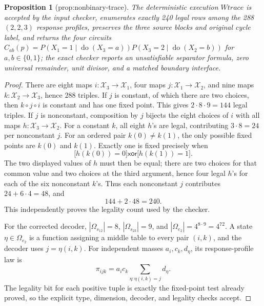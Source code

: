 \documentclass{article}
\newtheorem{proposition}{Proposition}
\begin{document}
\begin{proposition}[prop:nonbinary-trace]\label{prop:nonbinary-trace}
The deterministic execution \(Wtrace\) is accepted by the input checker, enumerates exactly 240 legal rows among the 288 \((2,2,3)\) response profiles, preserves the three source blocks and original cycle label, and returns the four circuits \(C_{ab}(p)=P(X_1=1\mid\operatorname{do}(X_3=a))P(X_3=2\mid\operatorname{do}(X_2=b))\) for \(a,b\in\{0,1\}\); the exact checker reports an unsatisfiable separator formula, zero universal remainder, unit divisor, and a matched boundary interface.
\end{proposition}
\begin{proof}
There are eight maps \(i:\mathcal X_3\to\mathcal X_1\), four maps \(j:\mathcal X_1\to\mathcal X_2\), and nine maps \(k:\mathcal X_2\to\mathcal X_3\), hence \(288\) triples.  If \(j\) is constant, of which there are two choices, then \(k\circ j\circ i\) is constant and has one fixed point.  This gives \(2\cdot8\cdot9=144\) legal triples.  If \(j\) is nonconstant, composition by \(j\) bijects the eight choices of \(i\) with all maps \(h:\mathcal X_3\to\mathcal X_2\).  For a constant \(k\), all eight \(h\)'s are legal, contributing \(3\cdot8=24\) per nonconstant \(j\).  For an ordered pair \(k(0)\ne k(1)\), the only possible fixed points are \(k(0)\) and \(k(1)\).  Exactly one is fixed precisely when
\[
 \bigl[h(k(0))=0\bigr]\mathbin{\mathsf{xor}}\bigl[h(k(1))=1\bigr].
\]
The two displayed values of \(h\) must then be equal; there are two choices for that common value and two choices at the third argument, hence four legal \(h\)'s for each of the six nonconstant \(k\)'s.  Thus each nonconstant \(j\) contributes \(24+6\cdot4=48\), and
\[
 144+2\cdot48=240.
\]
This independently proves the legality count used by the checker.

For the corrected decoder, \(|\Omega_{s_{12}}|=8\), \(|\Omega_{s_{23}}|=9\), and \(|\Omega_{e_2}|=4^{8\cdot9}=4^{72}\).  A state \(\eta\in\Omega_{e_2}\) is a function assigning a middle table to every pair \((i,k)\), and the decoder uses \(j=\eta(i,k)\).  For independent masses \(a_i,c_k,d_\eta\), its response-profile law is
\[
 \pi_{ijk}=a_ic_k\sum_{\eta:\eta(i,k)=j}d_\eta.
\]
The legality bit for each positive tuple is exactly the fixed-point test already proved, so the explicit type, dimension, decoder, and legality checks accept.


\end{proof}
\end{document}
